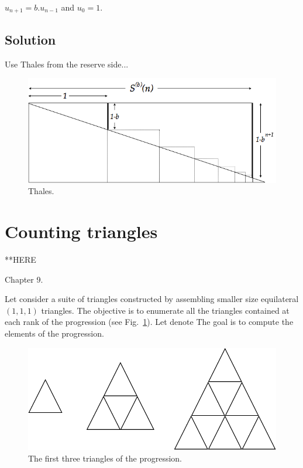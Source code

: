\documentclass{article}[12pt]
\begin{document}
$u_{n+1} = b.u_{n−1}$ and $u_0 = 1$.

\subsection{Solution} 

Use Thales from the reserve side...
\begin{figure}[h]
\begin{center}
        \includegraphics[scale=0.4]{FiguresArithmetic/ThalesGeometricSumFinite} 
        \caption{Thales.}
\end{center}
\end{figure}



\section{Counting triangles}

**HERE

Chapter 9.

Let consider a suite of triangles constructed by assembling smaller size equilateral $(1,1,1)$ triangles. 
The objective is to enumerate all the triangles contained at each rank of the progression
(see Fig.~\ref{fig:countingTriangles}). Let denote 
The goal is to compute the elements of the progression.
\begin{figure}[h]
\begin{center}
        \includegraphics[scale=0.4]{FiguresArithmetic/CountingTriangles} 
        \caption{The first three triangles of the progression.}
        \label{fig:countingTriangles}
\end{center}
\end{figure}
\end{document}
